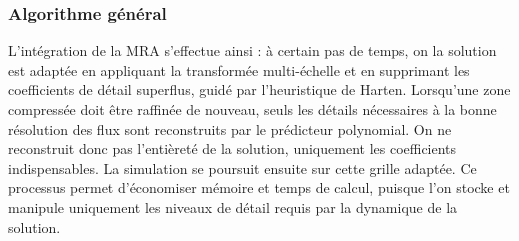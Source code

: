 \subsubsection{Algorithme général}
L'intégration de la MRA s'effectue ainsi : à certain pas de temps, on la solution est adaptée en appliquant la transformée multi-échelle et en supprimant les coefficients de détail superflus, guidé par l'heuristique de Harten. 
Lorsqu'une zone compressée doit être raffinée de nouveau, seuls les détails nécessaires à la bonne résolution des flux sont reconstruits par le prédicteur polynomial. 
On ne reconstruit donc pas l'entièreté de la solution, uniquement les coefficients indispensables. La simulation se poursuit ensuite sur cette grille adaptée.
Ce processus permet d'économiser mémoire et temps de calcul, puisque l'on stocke et manipule uniquement les niveaux de détail requis par la dynamique de la solution.
